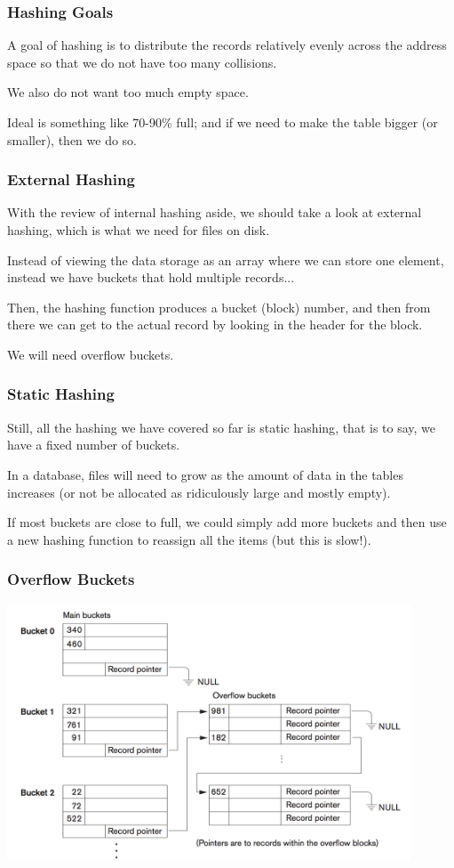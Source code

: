 \begin{frame}
\frametitle{Hashing Goals}

A goal of hashing is to distribute the records relatively evenly across the address space so that we do not have too many collisions.

We also do not want too much empty space. 

Ideal is something like 70-90\% full; and if we need to make the table bigger (or smaller), then we do so.

\end{frame}

\begin{frame}
\frametitle{External Hashing}

With the review of internal hashing aside, we should take a look at external hashing, which is what we need for files on disk. 

Instead of viewing the data storage as an array where we can store one element, instead we have buckets that hold multiple records... 

Then, the hashing function produces a bucket (block) number, and then from there we can get to the actual record by looking in the header for the block.

We will need overflow buckets.

\end{frame}

\begin{frame}
\frametitle{Static Hashing}
Still, all the hashing we have covered so far is \alert{static hashing}, that is to say, we have a fixed number of buckets. 

In a database, files will need to grow as the amount of data in the tables increases (or not be allocated as ridiculously large and mostly empty). 

If most buckets are close to full, we could simply add more buckets and then use a new hashing function to reassign all the items (but this is slow!).

\end{frame}


\begin{frame}
\frametitle{Overflow Buckets}

\begin{center}
	\includegraphics[width=0.9\textwidth]{images/overflow-buckets}
\end{center}

\end{frame}

